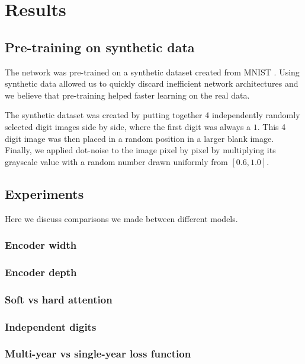 \section{Results}

\subsection{Pre-training on synthetic data} \label{ssec:pretrain}
The network was pre-trained on a synthetic dataset created from MNIST \cite{MNIST_orig}. Using synthetic data allowed us to quickly discard inefficient network architectures and we believe that pre-training helped faster learning on the real data.

The synthetic dataset was created by putting together 4 independently randomly selected digit images side by side, where the first digit was always a $1$. This 4 digit image was then placed in a random position in a larger blank image. Finally, we applied dot-noise to the image pixel by pixel by multiplying its grayscale value with a random number drawn uniformly from $[0.6, 1.0]$.


\subsection{Experiments}

Here we discuss comparisons we made between different models.

\subsubsection{Encoder width}

\subsubsection{Encoder depth}

\subsubsection{Soft vs hard attention}

\subsubsection{Independent digits} \label{sssec:ind_digits}

\subsubsection{Multi-year vs single-year loss function}
